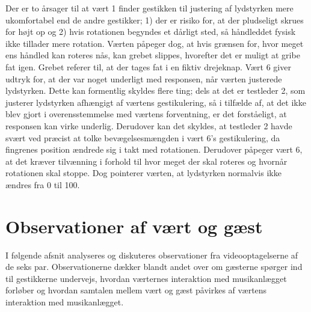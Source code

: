 Der er to årsager til at vært 1 finder gestikken til justering af lydstyrken mere ukomfortabel end de andre gestikker; 1) der er risiko for, at der pludseligt skrues for højt op og 2) hvis rotationen begyndes et dårligt sted, så håndleddet fysisk ikke tillader mere rotation. Værten påpeger dog, at hvis grænsen for, hvor meget ens håndled kan roteres nås, kan grebet slippes, hvorefter det er muligt at gribe fat igen. Grebet referer til, at der tages fat i en fiktiv drejeknap. Vært 6 giver udtryk for, at der var noget underligt med responsen, når værten justerede lydstyrken. Dette kan formentlig skyldes flere ting; dels at det er testleder 2, som justerer lydstyrken afhængigt af værtens gestikulering, så i tilfælde af, at det ikke blev gjort i overensstemmelse med værtens forventning, er det forståeligt, at responsen kan virke underlig. Derudover kan det skyldes, at testleder 2 havde svært ved præcist at tolke bevægelsesmængden i vært 6's gestikulering, da fingrenes position ændrede sig i takt med rotationen. Derudover påpeger vært 6, at det kræver tilvænning i forhold til hvor meget der skal roteres og hvornår rotationen skal stoppe. Dog pointerer værten, at lydstyrken normalvis ikke ændres fra 0 til 100. 
%
\section{Observationer af vært og gæst}
\label{TestresultaterSocialAcceptGestikkerObservationer}
%
I følgende afsnit analyseres og diskuteres observationer fra videooptagelserne af de seks par. Observationerne dækker blandt andet over om gæsterne spørger ind til gestikkerne undervejs, hvordan værternes interaktion med musikanlægget forløber og hvordan samtalen mellem vært og gæst påvirkes af værtens interaktion med musikanlægget.
%
